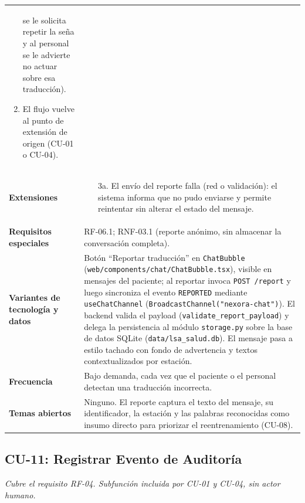 \begin{longtable}{@{}>{\raggedright\arraybackslash}p{4.1cm} >{\raggedright\arraybackslash}p{\dimexpr\textwidth-4.1cm-2\tabcolsep\relax}@{}}
\begin{enumerate}[leftmargin=*, itemsep=2pt]
    se le solicita repetir la seña y al personal se le advierte no actuar
    sobre esa traducción).
    \item El flujo vuelve al punto de extensión de origen (CU-01 o
    CU-04).
\end{enumerate} \\
\textbf{Extensiones} &
\begin{itemize}[leftmargin=*, itemsep=2pt]
    \item[3a.] El envío del reporte falla (red o validación): el sistema
    informa que no pudo enviarse y permite reintentar sin alterar el estado
    del mensaje.
\end{itemize} \\
\textbf{Requisitos especiales} & RF-06.1; RNF-03.1 (reporte anónimo, sin almacenar la conversación completa). \\
\textbf{Variantes de tecnología y datos} &
Botón ``Reportar traducción'' en \texttt{ChatBubble}
(\texttt{web/components/chat/ChatBubble.tsx}), visible en mensajes del
paciente; al reportar invoca \texttt{POST /report} y luego sincroniza el
evento \texttt{REPORTED} mediante \texttt{useChatChannel}
(\texttt{BroadcastChannel("nexora-chat")}). El backend valida el payload
(\texttt{validate\_report\_payload}) y delega la persistencia al módulo
\texttt{storage.py} sobre la base de datos SQLite (\texttt{data/lsa\_salud.db}).
El mensaje pasa a estilo tachado con fondo de advertencia y textos
contextualizados por estación. \\
\textbf{Frecuencia} &
Bajo demanda, cada vez que el paciente o el personal detectan una
traducción incorrecta. \\
\textbf{Temas abiertos} &
Ninguno. El reporte captura el texto del mensaje, su identificador, la
estación y las palabras reconocidas como insumo directo para priorizar el
reentrenamiento (CU-08). \\
\bottomrule
\end{longtable}

\subsection{CU-11: Registrar Evento de Auditoría}
\textit{Cubre el requisito RF-04. Subfunción incluida por CU-01 y CU-04, sin actor humano.}

